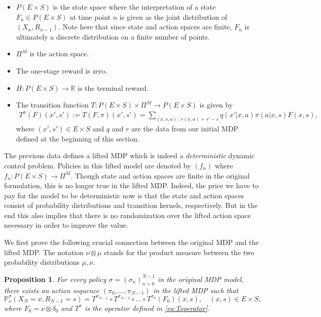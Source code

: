 \documentclass[reqno, 12pt]{amsart}%
\newcommand{\R}{\mathbb{R}} %
\newcommand{\PP}{\mathbb{P}}
\newtheorem{proposition}[theorem]{Proposition}
\theoremstyle{definition}
\numberwithin{equation}{section} \numberwithin{theorem}{section}
\begin{document}
\begin{itemize}
\item[(i)] $P(E\times S)$  is the  state space  where the interpretation of a  state $F_n\in P(E\times S)$ at time point $n$ is given as the joint distribution of $(X_{n},R_{n-1})$. Note here that since state and action spaces are finite, $F_n$ is ultimately a discrete distribution on a finite number of points.
\item[(ii)] $ \Pi^M$
 is the action space.
 \item[(iii)] The  one-stage reward is zero.
 \item[(iv)] $H:P(E\times S) \to \R$ is the  terminal reward.
 \item[(v)] The transition function $T:P(E\times S) \times \Pi^M \to P(E\times S)$  is given by 
\begin{align}\label{eq:Toperator}
    T^\pi(F)(x',s') :=  T(F,\pi)(x',s')=\sum_{(x,s,a) \, : \, r(x,a)=s'-s}  q(x'|x,a)\pi(a|x,s) F(x,s),
\end{align} 
where $(x',s') \in E\times S$ and $q$ and $r$ are the data from our initial MDP defined at the beginning of this section.
\end{itemize}
The previous  data defines a lifted MDP which is indeed a {\em deterministic} dynamic control problem. Policies in this lifted model are denoted by $(f_n)$ where $f_n : P(E\times S) \to \Pi^M. $ Though state and action spaces are finite in the original formulation, this is no longer true in the lifted MDP.  Indeed, the price we have to pay for the model to be deterministic now is that the state and action spaces consist of probability distributions and transition kernels, respectively. But in the end this also implies that there is no randomization over the lifted action space necessary in order to improve the value.


We first prove the following crucial connection between the original MDP and the lifted MDP. 
 The notation $\nu\otimes\mu $ stands 
for the product measure between the two probability 
distributions $\mu,\nu.$ 

\begin{proposition}\label{prop:1}
For every policy $\sigma=(\sigma_n)_{n=0}^{N-1}$ in
the original MDP model, there exists an action
sequence $(\pi_0,\ldots,\pi_{N-1})$ in the lifted 
MDP such that
$$\PP^\sigma_\nu(X_N=x, R_{N-1}=s) = 
T^{\pi_{N-1}}\circ T^{\pi_{N-2}} \circ \ldots \circ 
T^{\pi_0}(F_0)(x,s),\quad (x,s)\in E\times S,  $$
where $F_0= \nu \otimes \delta_0$ and $T^\pi$ is 
the operator defined in \eqref{eq:Toperator}.
\end{proposition}
\end{document}
